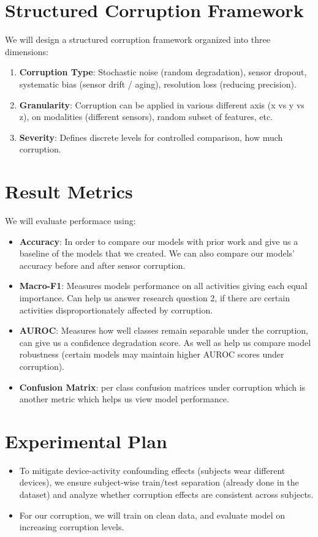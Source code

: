 \documentclass{article}
\begin{document}
\section{Structured Corruption Framework}
We will design a structured corruption framework organized into three dimensions:
\begin{enumerate}
    \item \textbf{Corruption Type}: Stochastic noise (random degradation), sensor dropout, systematic bias (sensor drift / aging), resolution loss (reducing precision).
    \item \textbf{Granularity}: Corruption can be applied in various different axis (x vs y vs z), on modalities (different sensors), random subset of features, etc.
    \item \textbf{Severity}: Defines discrete levels for controlled comparison, how much corruption.
\end{enumerate}

\section{Result Metrics}
We will evaluate performace using:
\begin{itemize}
    \item \textbf{Accuracy}: In order to compare our models with prior work and give us a baseline of the models that we created. We can also compare our models' accuracy before and after sensor corruption.
    \item \textbf{Macro-F1}: Measures models performance on all activities giving each equal importance. Can help us answer research question 2, if there are certain activities disproportionately affected by corruption.
    \item \textbf{AUROC}: Measures how well classes remain separable under the corruption, can give us a confidence degradation score. As well as help us compare model robustness (certain models may maintain higher AUROC scores under corruption).
    \item \textbf{Confusion Matrix}: per class confusion matrices under corruption which is another metric which helps us view model performance.
\end{itemize}

\section{Experimental Plan}
\begin{itemize}
    \item To mitigate device-activity confounding effects (subjects wear different devices), we ensure subject-wise train/test separation (already done in the dataset) and analyze whether corruption effects are consistent across subjects.
    \item For our corruption, we will train on clean data, and evaluate model on increasing corruption levels.
\end{itemize}
\end{document}
